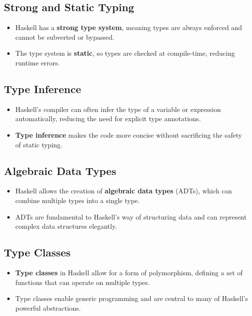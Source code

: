 \subsection{Strong and Static Typing}
\begin{itemize}
	\item Haskell has a \textbf{strong type system}, meaning types are always enforced and cannot be subverted or bypassed.
	\item The type system is \textbf{static}, so types are checked at compile-time, reducing runtime errors.
\end{itemize}

\subsection{Type Inference}
\begin{itemize}
	\item Haskell's compiler can often infer the type of a variable or expression automatically, reducing the need for explicit type annotations.
	\item \textbf{Type inference} makes the code more concise without sacrificing the safety of static typing.
\end{itemize}

\subsection{Algebraic Data Types}
\begin{itemize}
	\item Haskell allows the creation of \textbf{algebraic data types} (ADTs), which can combine multiple types into a single type.
	\item ADTs are fundamental to Haskell's way of structuring data and can represent complex data structures elegantly.
\end{itemize}

\subsection{Type Classes}
\begin{itemize}
	\item \textbf{Type classes} in Haskell allow for a form of polymorphism, defining a set of functions that can operate on multiple types.
	\item Type classes enable generic programming and are central to many of Haskell's powerful abstractions.
\end{itemize}

